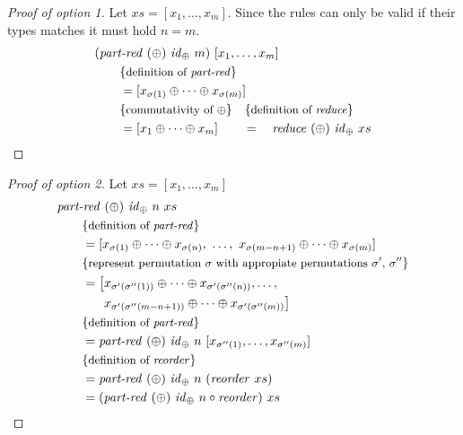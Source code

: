 \begin{proof}[Proof of option 1]
  Let $xs = [x_1, \ldots, x_m]$.
  Since the rules can only be valid if their types matches it must hold $n=m$.
  \begin{align*}
    &(\partRed\ (\oplus)\ \id_\oplus\ m)\ [x_1, \ldots, x_m]\\
    &\qquad \comment{definition of \partRed}\\
    &\qquad = [x_{\sigma(1)} \oplus \dots \oplus x_{\sigma(m)}]\\
    &\qquad \comment{commutativity of $\oplus$} \quad \comment{definition of \reduce}\\
    &\qquad = [x_1 \oplus \dots \oplus x_m]\qquad =\quad \reduce\ (\oplus)\ \id_\oplus\ xs
  \end{align*}
\end{proof}

\begin{proof}[Proof of option 2]
  Let $xs = [x_1, \ldots, x_m]$
  \begin{align*}
    &\partRed\ (\oplus)\ \id_\oplus\ n\ xs\\
    &\qquad \comment{definition of \partRed}\\
    &\qquad = [x_{\sigma(1)} \oplus \dots \oplus x_{\sigma(n)},\ \ldots,\ x_{\sigma(m-n+1)} \oplus \dots \oplus x_{\sigma(m)}]\\
    &\qquad \comment{represent permutation $\sigma$ with appropiate permutations $\sigma'$, $\sigma''$}\\
    &\qquad =
      \begin{aligned}[t]
        \big[&x_{\sigma'(\sigma''(1))} \oplus \dots \oplus x_{\sigma'(\sigma''(n))}, \ldots,\\
         &x_{\sigma'(\sigma''(m-n+1))} \oplus \dots \oplus x_{\sigma'(\sigma''(m))}\big]
       \end{aligned}\\
    &\qquad \comment{definition of \partRed}\\
    &\qquad = \partRed\ (\oplus)\ \id_\oplus\ n\ [x_{\sigma''(1)}, \ldots, x_{\sigma''(m)}]\\
    &\qquad \comment{definition of \reorder}\\
    &\qquad = \partRed\ (\oplus)\ \id_\oplus\ n\ (\reorder\ xs)\\
    &\qquad = (\partRed\ (\oplus)\ \id_\oplus\ n \circ \reorder)\ xs
  \end{align*}
\end{proof}

